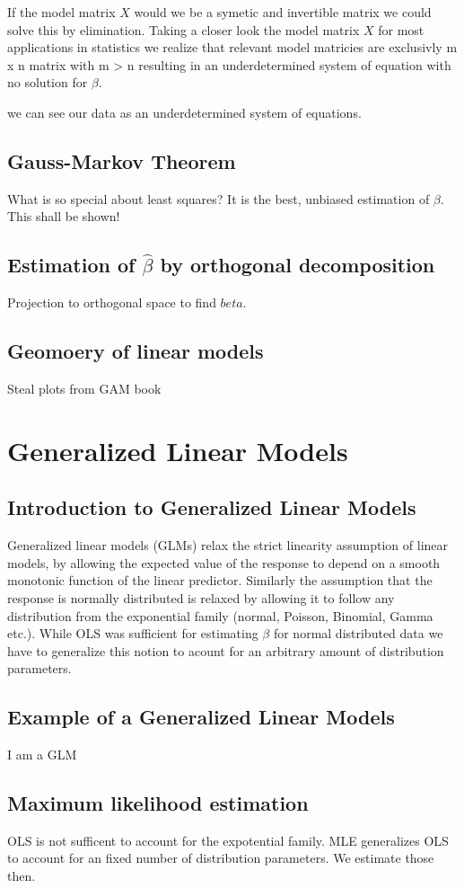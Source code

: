 \documentclass{article}
\begin{document}
    If the model matrix $X$ would we be a symetic and invertible matrix we could solve this by elimination. Taking a closer look the model matrix $X$ for most applications in statistics we realize that relevant model matricies are exclusivly m x n matrix with m > n resulting in an underdetermined system of equation with no solution for $\beta$.


    we can see our data as an underdetermined system of equations.

    \subsection{Gauss-Markov Theorem}
    What is so special about least squares? It is the best, unbiased estimation of $\beta$. This shall be shown!
    \subsection{Estimation of $\widehat{\beta}$ by orthogonal decomposition}
    Projection to orthogonal space to find $beta$.
    \subsection{Geomoery of linear models}
    Steal plots from GAM book

    \section{Generalized Linear Models}
    \subsection{Introduction to Generalized Linear Models}
    Generalized linear models (GLMs) relax the strict linearity assumption of linear models, by allowing the expected value of the response to depend on a smooth monotonic function of the linear predictor. Similarly the assumption that the response is normally distributed is relaxed by allowing it to follow any distribution from the exponential family (normal, Poisson, Binomial, Gamma etc.). While OLS was sufficient for estimating $\beta$ for normal distributed data we have to generalize this notion to acount for an arbitrary amount of distribution parameters.
    \subsection{Example of a Generalized Linear Models}
    I am a GLM
    \subsection{Maximum likelihood estimation}
    OLS is not sufficent to account for the expotential family. MLE generalizes OLS to account for an fixed number of distribution parameters. We estimate those then.
\end{document}
